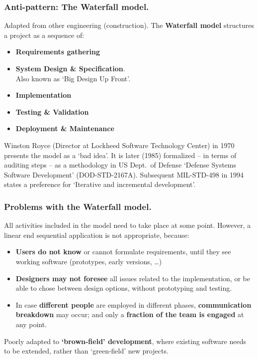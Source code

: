 \documentclass{beamer} %
\newcommand\emc[1]{\textcolor{brightblue}{\textbf{#1}}}
\begin{document}
\begin{frame}
\frametitle{Anti-pattern: The Waterfall model.}

Adapted from other engineering (construction). The \emc{Waterfall model} structures a project as a sequence of:
\begin{itemize}
\item \emc{Requirements gathering}
\item \emc{System Design \& Specification}. \\ Also known as `Big Design Up Front'.
\item \emc{Implementation}
\item \emc{Testing \& Validation}
\item \emc{Deployment \& Maintenance}
\end{itemize}

\begin{block}{}
\small Winston Royce (Director at Lockheed Software Technology Center) in 1970 presents the model as a `bad idea'. It is later (1985) formalized -- in terms of auditing steps -- as a methodology in US Dept.\ of Defense `Defense Systems Software Development' (DOD-STD-2167A). Subsequent MIL-STD-498 in 1994 states a preference for `Iterative and incremental development'.
\end{block}

\end{frame}

\begin{frame}
\frametitle{Problems with the Waterfall model.}

All activities included in the model need to take place at some point. However, a linear end sequential application is not appropriate, because:
\begin{itemize}
  \item \emc{Users do not know} or cannot formulate requirements, until they see working software (prototypes, early versions, \ldots)
  \item \emc{Designers may not foresee} all issues related to the implementation, or be able to chose between design options, without prototyping and testing.
  \item In case \emc{different people} are employed in different phases, \emc{communication breakdown} may occur; and only a \emc{fraction of the team is engaged} at any point.
\end{itemize}

Poorly adapted to \emc{`brown-field' development}, where existing software needs to be extended, rather than `green-field' new projects.

\end{frame}
\end{document}
